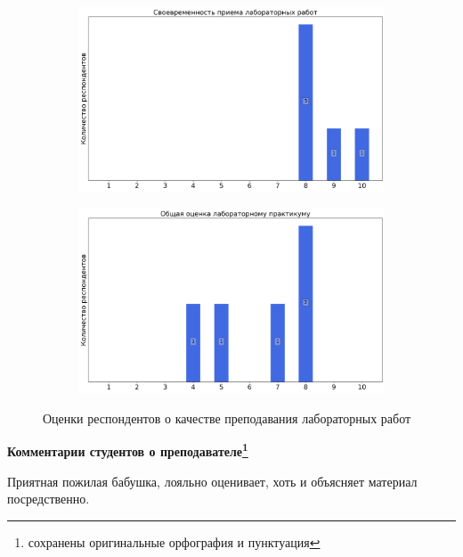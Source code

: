 \begin{figure}[H]
\begin{subfigure}[b]{0.45\textwidth}
            \end{subfigure}
            \begin{subfigure}[b]{0.45\textwidth}
                \centering
                \includegraphics[width=\textwidth]{images/1 course/Общая физика - механика/labniks-marks-Черкасова Е.К.-2.png}
            \end{subfigure}
            \begin{subfigure}[b]{0.45\textwidth}
                \centering
                \includegraphics[width=\textwidth]{images/1 course/Общая физика - механика/labniks-marks-Черкасова Е.К.-3.png}
            \end{subfigure}	
            \caption{Оценки респондентов о качестве преподавания лабораторных работ}
        \end{figure}

        \textbf{Комментарии студентов о преподавателе\protect\footnote{сохранены оригинальные орфография и пунктуация}}
            \begin{commentbox} 
                Приятная пожилая бабушка, лояльно оценивает, хоть и объясняет материал посредственно. 
            \end{commentbox} 
        
